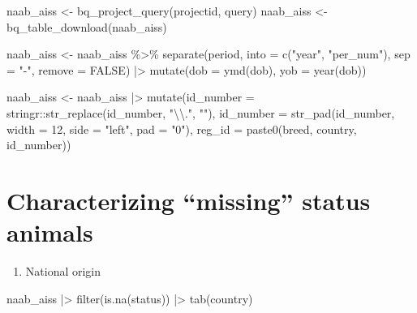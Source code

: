 \documentclass[
]{article}
\newenvironment{Shaded}{\begin{snugshade}}{\end{snugshade}}
\newcommand{\AttributeTok}[1]{\textcolor[rgb]{0.77,0.63,0.00}{#1}}
\newcommand{\ConstantTok}[1]{\textcolor[rgb]{0.00,0.00,0.00}{#1}}
\newcommand{\DecValTok}[1]{\textcolor[rgb]{0.00,0.00,0.81}{#1}}
\newcommand{\FunctionTok}[1]{\textcolor[rgb]{0.00,0.00,0.00}{#1}}
\newcommand{\NormalTok}[1]{#1}
\newcommand{\OtherTok}[1]{\textcolor[rgb]{0.56,0.35,0.01}{#1}}
\newcommand{\SpecialCharTok}[1]{\textcolor[rgb]{0.00,0.00,0.00}{#1}}
\newcommand{\StringTok}[1]{\textcolor[rgb]{0.31,0.60,0.02}{#1}}
\providecommand{\tightlist}{%
  \setlength{\itemsep}{0pt}\setlength{\parskip}{0pt}}
\begin{document}
\begin{Shaded}
\begin{Highlighting}[]
\NormalTok{naab\_aiss }\OtherTok{\textless{}{-}} \FunctionTok{bq\_project\_query}\NormalTok{(projectid, query)}
\NormalTok{naab\_aiss }\OtherTok{\textless{}{-}} \FunctionTok{bq\_table\_download}\NormalTok{(naab\_aiss)}

\NormalTok{naab\_aiss }\OtherTok{\textless{}{-}}\NormalTok{ naab\_aiss }\SpecialCharTok{\%\textgreater{}\%}
  \FunctionTok{separate}\NormalTok{(period, }\AttributeTok{into =} \FunctionTok{c}\NormalTok{(}\StringTok{"year"}\NormalTok{, }\StringTok{"per\_num"}\NormalTok{), }\AttributeTok{sep =} \StringTok{"{-}"}\NormalTok{, }\AttributeTok{remove =} \ConstantTok{FALSE}\NormalTok{) }\SpecialCharTok{|\textgreater{}}
  \FunctionTok{mutate}\NormalTok{(}\AttributeTok{dob =} \FunctionTok{ymd}\NormalTok{(dob),}
         \AttributeTok{yob =} \FunctionTok{year}\NormalTok{(dob))}

\NormalTok{naab\_aiss }\OtherTok{\textless{}{-}}\NormalTok{ naab\_aiss }\SpecialCharTok{|\textgreater{}}
  \FunctionTok{mutate}\NormalTok{(}\AttributeTok{id\_number =}\NormalTok{ stringr}\SpecialCharTok{::}\FunctionTok{str\_replace}\NormalTok{(id\_number, }\StringTok{"}\SpecialCharTok{\textbackslash{}\textbackslash{}}\StringTok{."}\NormalTok{, }\StringTok{""}\NormalTok{),}
         \AttributeTok{id\_number =} \FunctionTok{str\_pad}\NormalTok{(id\_number, }\AttributeTok{width =} \DecValTok{12}\NormalTok{, }\AttributeTok{side =} \StringTok{"left"}\NormalTok{, }\AttributeTok{pad =} \StringTok{"0"}\NormalTok{),}
         \AttributeTok{reg\_id =} \FunctionTok{paste0}\NormalTok{(breed, country, id\_number))}
\end{Highlighting}
\end{Shaded}

\hypertarget{characterizing-missing-status-animals}{%
\section{Characterizing ``missing'' status
animals}\label{characterizing-missing-status-animals}}

\begin{enumerate}
\def\labelenumi{\arabic{enumi}.}
\tightlist
\item
  National origin
\end{enumerate}

\begin{Shaded}
\begin{Highlighting}[]
\NormalTok{naab\_aiss }\SpecialCharTok{|\textgreater{}}
  \FunctionTok{filter}\NormalTok{(}\FunctionTok{is.na}\NormalTok{(status)) }\SpecialCharTok{|\textgreater{}}
  \FunctionTok{tab}\NormalTok{(country)}
\end{Highlighting}
\end{Shaded}
\end{document}
